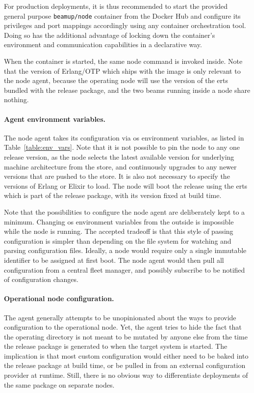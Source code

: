 For production deployments, it is thus recommended to start the provided general purpose \lstinline|beamup/node| container from the Docker Hub and configure its privileges and port mappings accordingly using any container orchestration tool. Doing so has the additional advantage of locking down the container's environment and communication capabilities in a declarative way.

When the container is started, the same node command is invoked inside. Note that the version of Erlang/OTP which ships with the image is only relevant to the node agent, because the operating node will use the version of the \acrshort{erts} bundled with the release package, and the two \acrshort{beam}s running inside a node share nothing.

\paragraph{Agent environment variables.}

The node agent takes its configuration via \acrshort{os} environment variables, as listed in Table~\ref{table:env_vars}. Note that it is not possible to pin the node to any one release version, as the node selects the latest available version for underlying machine architecture from the store, and continuously upgrades to any newer versions that are pushed to the store. It is also not necessary to specify the versions of Erlang or Elixir to load. The node will boot the release using the \acrshort{erts} which is part of the release package, with its version fixed at build time.

Note that the possibilities to configure the node agent are deliberately kept to a minimum. Changing \acrshort{os} environment variables from the outside is impossible while the node is running. The accepted tradeoff is that this style of passing configuration is simpler than depending on the file system for watching and parsing configuration files. Ideally, a node would require only a single immutable identifier to be assigned at first boot. The node agent would then pull all configuration from a central fleet manager, and possibly subscribe to be notified of configuration changes.





\paragraph{Operational node configuration.}
The agent generally attempts to be unopinionated about the ways to provide configuration to the operational node. Yet, the agent tries to hide the fact that the operating directory is not meant to be mutated by anyone else from the time the release package is generated to when the target system is started. The implication is that most custom configuration would either need to be baked into the release package at build time, or be pulled in from an external configuration provider at runtime. Still, there is no obvious way to differentiate deployments of the same package on separate nodes.

